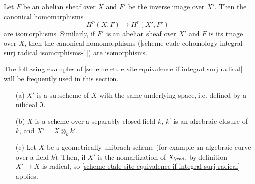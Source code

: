 \begin{corollary}\label{scheme etale cohomology integral surj radical isomorphisms}
Let $F$ be an abelian sheaf over $X$ and $F'$ be the inverse image over $X'$. Then the canonical homomorphisms
\begin{equation}\label{scheme etale cohomology integral surj radical isomorphisms-1}
H^p(X,F)\to H^p(X',F')
\end{equation}
are isomorphisms. Similarly, if $F'$ is an abelian sheaf over $X'$ and $F$ is its image over $X$, then the canonical homomorphisms (\ref{scheme etale cohomology integral surj radical isomorphisms-1}) are isomorphisms.
\end{corollary}

\begin{example}\label{scheme etale integral surj radical eg}
The following examples of \cref{scheme etale site equivalence if integral surj radical} will be frequently used in this section.
\begin{enumerate}
    \item[(a)] $X'$ is a subscheme of $X$ with the same underlying space, i.e. defined by a nilideal $\mathfrak{I}$.
    \item[(b)] $X$ is a scheme over a separably closed field $k$, $k'$ is an algebraic closure of $k$, and $X'=X\otimes_kk'$.
    \item[(c)] Let $X$ be a geometrically unibrach scheme (for example an algebraic curve over a field $k$). Then, if $X'$ is the nomarlization of $X_\red$, by definition $X'\to X$ is radical, so \cref{scheme etale site equivalence if integral surj radical} applies. 
\end{enumerate}
\end{example}

